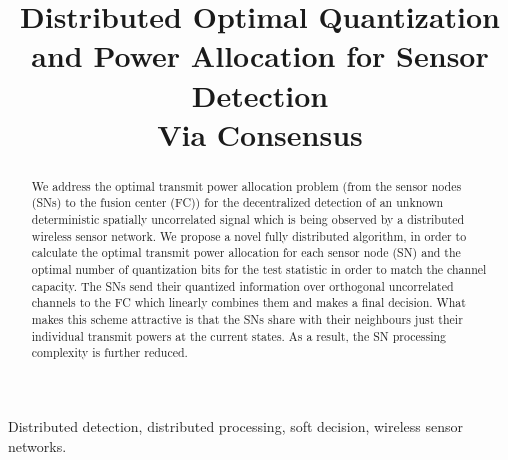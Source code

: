 \documentclass[conference]{IEEEtran}
\begin{document}
\title{Distributed Optimal Quantization and Power Allocation for  Sensor Detection\\ Via Consensus}






\author{
}

\def\x{{\mathbf x}}
\def\L{{\cal L}}


\maketitle

\begin{abstract}
We address the optimal transmit power allocation problem (from the sensor nodes (SNs) to the fusion center (FC)) for the decentralized detection of an unknown deterministic spatially uncorrelated  signal which is being observed by a distributed wireless sensor network.  We propose a novel fully distributed algorithm, in order to calculate the optimal transmit power allocation for each sensor node (SN) and the optimal number of quantization bits for the test statistic in order to match the channel capacity. The SNs send their  quantized information over orthogonal uncorrelated channels to the FC which linearly combines them and makes a final decision. What makes this scheme attractive is that the SNs share with their neighbours just their individual transmit powers at the current states. As a result, the SN processing complexity is further reduced.
\end{abstract}
\begin{IEEEkeywords}
Distributed detection, distributed  processing, soft decision, wireless sensor networks.
\end{IEEEkeywords}
\end{document}
